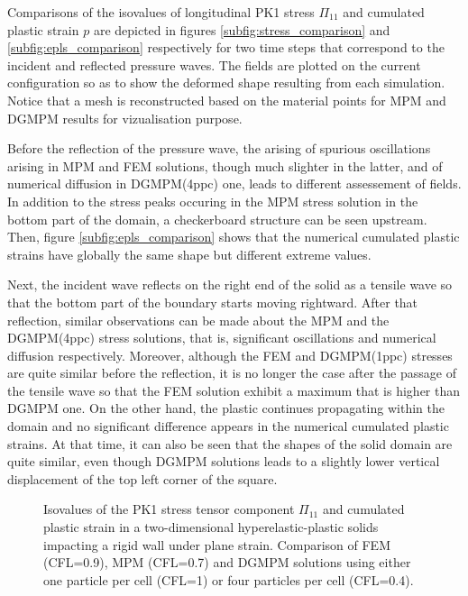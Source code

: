 Comparisons of the isovalues of longitudinal PK1 stress $\Pi_{11}$ and cumulated plastic strain $p$ are depicted in figures \ref{subfig:stress_comparison} and \ref{subfig:epls_comparison} respectively for two time steps that correspond to the incident and reflected pressure waves.
The fields are plotted on the current configuration so as to show the deformed shape resulting from each simulation.
Notice that a mesh is reconstructed based on the material points for MPM and DGMPM results for vizualisation purpose.

Before the reflection of the pressure wave, the arising of spurious oscillations arising in MPM and FEM solutions, though much slighter in the latter, and of numerical diffusion in DGMPM(4ppc) one, leads to different assessement of fields.
In addition to the stress peaks occuring in the MPM stress solution in the bottom part of the domain, a checkerboard structure can be seen upstream.
Then, figure \ref{subfig:epls_comparison} shows that the numerical cumulated plastic strains have globally the same shape but different extreme values.

Next, the incident wave reflects on the right end of the solid as a tensile wave so that the bottom part of the boundary starts moving rightward.
After that reflection, similar observations can be made about the MPM and the DGMPM(4ppc) stress solutions, that is, significant oscillations and numerical diffusion respectively.
Moreover, although the FEM and DGMPM(1ppc) stresses are quite similar before the reflection, it is no longer the case after the passage of the tensile wave so that the FEM solution exhibit a maximum that is higher than DGMPM one.
On the other hand, the plastic continues propagating within the domain and no significant difference appears in the numerical cumulated plastic strains.
At that time, it can also be seen that the shapes of the solid domain are quite similar, even though DGMPM solutions leads to a slightly lower vertical displacement of the top left corner of the square.
\begin{figure}[ht]
  \centering
  \qquad
  \caption{Isovalues of the PK1 stress tensor component $\Pi_{11}$ and cumulated plastic strain in a two-dimensional hyperelastic-plastic solids impacting a rigid wall under plane strain. Comparison of FEM (CFL=0.9), MPM (CFL=0.7) and DGMPM solutions using either one particle per cell (CFL=1) or four particles per cell (CFL=0.4).}
  \label{fig:PS_taylor}
\end{figure}


